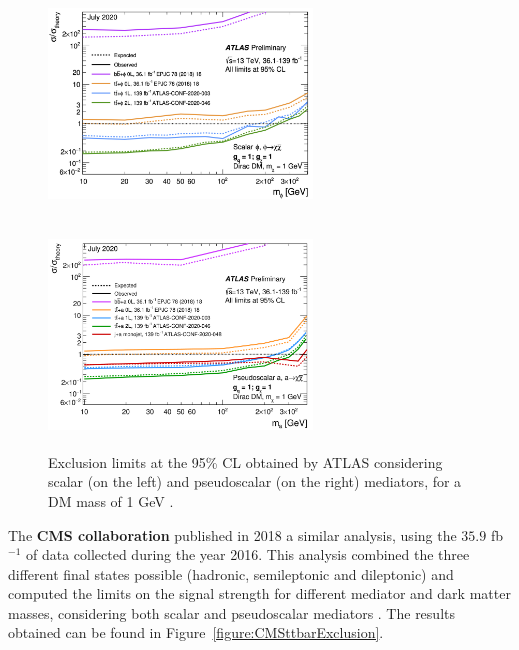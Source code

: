 \documentclass[a4paper, 10pt, openright]{report}
\begin{document}
\begin{figure}[htbp]
\centering
\begin{minipage}[b]{.4\textwidth}
\includegraphics[width=7cm, height=6cm]{figs/ATLASttDM_scalar.png}
\end{minipage}\hfill
\begin{minipage}[b]{.48\textwidth}
\includegraphics[width=7cm, height=6cm]{figs/ATLASttDM_pseudoscalar.png}
\end{minipage}\hfill
\caption{Exclusion limits at the 95\% \ac{CL} obtained by \ac{ATLAS} considering  scalar (on the left) and pseudoscalar (on the right) mediators, for a \ac{DM} mass of 1 GeV \cite{ATLASICHEP2020}.}
\label{fig:ATLASICHEP2}
\end{figure}

The \textbf{\ac{CMS} collaboration} published in 2018 a similar analysis, using the $35.9$ fb$^{-1}$ of data collected during the year 2016. This analysis combined the three different final states possible (hadronic, semileptonic and dileptonic) and computed the limits on the signal strength for different mediator and dark matter masses, considering both scalar and pseudoscalar mediators \cite{PreviousDoubleTopAllLep13CMS}. The results obtained can be found in Figure~\ref{figure:CMSttbarExclusion}. 
\end{document}
